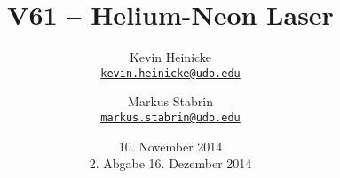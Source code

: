 



\title{%
    V61 -- Helium-Neon Laser
}
\author{%
    Kevin Heinicke\\
    \texttt{\href{mailto:kevin.heinicke@udo.edu}{kevin.heinicke@udo.edu}}
    \and
    Markus Stabrin\\
    \texttt{\href{mailto:markus.stabrin@udo.edu}{markus.stabrin@udo.edu}}
}
\date{%
    10. November 2014\\
    {\small 2. Abgabe} 16. Dezember 2014
}

    \maketitle%
    \tableofcontents
    \newpage

    
    
    
    \printbibliography

